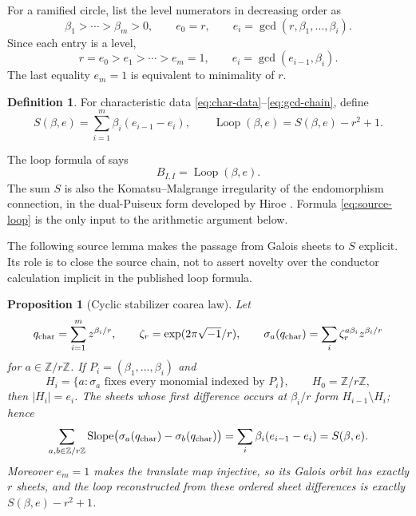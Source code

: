 \documentclass[11pt,a4paper]{amsart}
\theoremstyle{plain}
\newtheorem{proposition}[theorem]{Proposition}
\theoremstyle{definition}
\newtheorem{definition}[theorem]{Definition}
\newcommand{\ZZ}{\mathbb Z}
\newcommand{\Slope}{\operatorname{Slope}}
\newcommand{\Loop}{\operatorname{Loop}}
\begin{document}
For a ramified circle, list the level numerators in decreasing order as
\begin{equation}\label{eq:char-data}
 \beta_1>\cdots>\beta_m>0,
 \qquad e_0=r,
 \qquad e_i=\gcd(r,\beta_1,\ldots,\beta_i).
\end{equation}
Since each entry is a level,
\begin{equation}\label{eq:gcd-chain}
 r=e_0>e_1>\cdots>e_m=1,
 \qquad e_i=\gcd(e_{i-1},\beta_i).
\end{equation}
The last equality $e_m=1$ is equivalent to minimality of $r$.

\begin{definition}\label{def:weighted-loop}
For characteristic data \eqref{eq:char-data}--\eqref{eq:gcd-chain}, define
\[
 S(\beta,e)=\sum_{i=1}^m\beta_i(e_{i-1}-e_i),
 \qquad
 \Loop(\beta,e)=S(\beta,e)-r^2+1.
\]
\end{definition}

The loop formula of \cite[Lemma~2.1]{Doucot2025Graphs} says
\begin{equation}\label{eq:source-loop}
 B_{I,I}=\Loop(\beta,e).
\end{equation}
The sum $S$ is also the Komatsu--Malgrange irregularity of the endomorphism connection, in the
dual-Puiseux form developed by Hiroe \cite{Hiroe2017}.  Formula \eqref{eq:source-loop} is the only
input to the arithmetic argument below.

The following source lemma makes the passage from Galois sheets to $S$ explicit.  Its role is to
close the source chain, not to assert novelty over the conductor calculation implicit in the
published loop formula.

\begin{proposition}[Cyclic stabilizer coarea law]\label{prop:cyclic-source}
Let
\[
 q_{\rm char}=\sum_{i=1}^{m}z^{\beta_i/r},
 \qquad \zeta_r=\exp(2\pi\sqrt{-1}/r),
 \qquad \sigma_a(q_{\rm char})=\sum_i\zeta_r^{a\beta_i}z^{\beta_i/r}
\]
for $a\in\ZZ/r\ZZ$.  If $P_i=(\beta_1,\ldots,\beta_i)$ and
\[
 H_i=\{a:\sigma_a\text{ fixes every monomial indexed by }P_i\},
 \qquad H_0=\ZZ/r\ZZ,
\]
then $|H_i|=e_i$.  The sheets whose first difference occurs at
$\beta_i/r$ form $H_{i-1}\setminus H_i$; hence
\[
 \sum_{a,b\in\ZZ/r\ZZ}\Slope\bigl(\sigma_a(q_{\rm char})-
 \sigma_b(q_{\rm char})\bigr)
 =\sum_i\beta_i(e_{i-1}-e_i)=S(\beta,e).
\]
Moreover $e_m=1$ makes the translate map injective, so its Galois orbit has exactly $r$ sheets, and
the loop reconstructed from these ordered sheet differences is exactly
$S(\beta,e)-r^2+1$.
\end{proposition}
\end{document}
